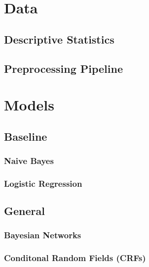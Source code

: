 \documentclass{article}
\begin{document}


\section{Data}
\label{sec:data}
\subsection{Descriptive Statistics}
\label{sec:stats}
\subsection{Preprocessing Pipeline}
\label{sec:pipeline}



\section{Models}
\label{sec:models}
\subsection{Baseline}
\label{sec:baseline}
\subsubsection{Naive Bayes}
\label{sec:NB}
\subsubsection{Logistic Regression}
\label{sec:LR}
\subsection{General}
\label{sec:general}
\subsubsection{Bayesian Networks}
\label{sec:GBN}
\subsubsection{Conditonal Random Fields (CRFs)}
\label{sec:CRF}


\end{document}
